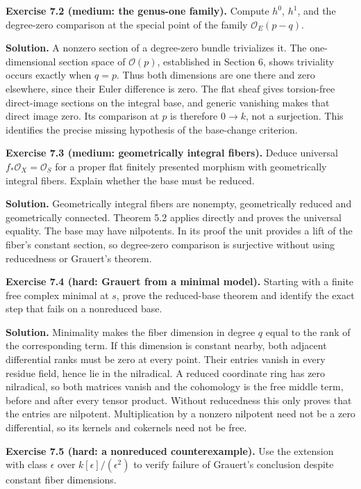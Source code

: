 \documentclass[11pt]{article}
\begin{document}
\textbf{Exercise 7.2 (medium: the genus-one family).} Compute \(h^0\),
\(h^1\), and the degree-zero comparison at the special point of the
family \(\mathcal O_E(p-q)\).

\textbf{Solution.} A nonzero section of a degree-zero bundle trivializes
it. The one-dimensional section space of \(\mathcal O(p)\), established
in Section 6, shows triviality occurs exactly when \(q=p\). Thus both
dimensions are one there and zero elsewhere, since their Euler
difference is zero. The flat sheaf gives torsion-free direct-image
sections on the integral base, and generic vanishing makes that direct
image zero. Its comparison at \(p\) is therefore \(0\to k\), not a
surjection. This identifies the precise missing hypothesis of the
base-change criterion.

\textbf{Exercise 7.3 (medium: geometrically integral fibers).} Deduce
universal \(f_*\mathcal O_X=\mathcal O_S\) for a proper flat finitely
presented morphism with geometrically integral fibers. Explain whether
the base must be reduced.

\textbf{Solution.} Geometrically integral fibers are nonempty,
geometrically reduced and geometrically connected. Theorem 5.2 applies
directly and proves the universal equality. The base may have
nilpotents. In its proof the unit provides a lift of the fiber's
constant section, so degree-zero comparison is surjective without using
reducedness or Grauert's theorem.

\textbf{Exercise 7.4 (hard: Grauert from a minimal model).} Starting
with a finite free complex minimal at \(s\), prove the reduced-base
theorem and identify the exact step that fails on a nonreduced base.

\textbf{Solution.} Minimality makes the fiber dimension in degree \(q\)
equal to the rank of the corresponding term. If this dimension is
constant nearby, both adjacent differential ranks must be zero at every
point. Their entries vanish in every residue field, hence lie in the
nilradical. A reduced coordinate ring has zero nilradical, so both
matrices vanish and the cohomology is the free middle term, before and
after every tensor product. Without reducedness this only proves that
the entries are nilpotent. Multiplication by a nonzero nilpotent need
not be a zero differential, so its kernels and cokernels need not be
free.

\textbf{Exercise 7.5 (hard: a nonreduced counterexample).} Use the
extension with class \(\epsilon\) over \(k[\epsilon]/(\epsilon^2)\) to
verify failure of Grauert's conclusion despite constant fiber
dimensions.
\end{document}
